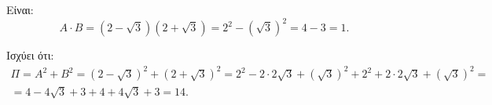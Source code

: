 
\begin{alist}
\item Είναι:
\[A \cdot B = (2 - \sqrt{3})(2 + \sqrt{3}) = 2^2 - (\sqrt{3})^2 = 4 - 3 = 1.\]

\item Ισχύει ότι:
\begin{gather*}
\Pi = A^2 + B^2 = (2 - \sqrt{3})^2 + (2 + \sqrt{3})^2 = 2^2 - 2 \cdot 2\sqrt{3} + (\sqrt{3})^2 + 2^2 + 2 \cdot 2\sqrt{3} + (\sqrt{3})^2 = \\
= 4 - 4\sqrt{3} + 3 + 4 + 4\sqrt{3} + 3 = 14.
\end{gather*}
\end{alist}

